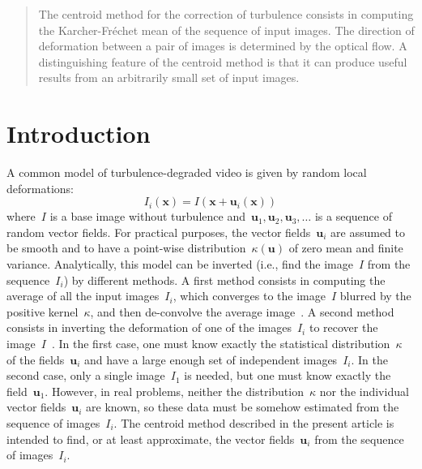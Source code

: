 \documentclass{ipol}
\def\x{\mathbf{x}}
\def\u{\mathbf{u}}
\begin{document}
\begin{abstract}
	The centroid method for the correction of turbulence consists in computing
	the Karcher-Fréchet mean of the sequence of input images.  The direction of
	deformation between a pair of images is determined by the optical flow.
	A distinguishing feature of the centroid method is that it can produce
	useful results from an arbitrarily small set of input images.
\end{abstract}

%
%
%
%

\section{Introduction}

A common model of turbulence-degraded video is given by random local
deformations:
\begin{equation}
	I_i(\x)=I(\x+\u_i(\x)) %
\end{equation}
where~$I$ is a base image without turbulence and~$\u_1, \u_2, \u_3,\ldots$ is a sequence of
random vector fields.  For practical purposes, the vector fields~$\u_i$ are
assumed to be smooth and to have a point-wise distribution~$\kappa(\u)$ of
zero mean and finite variance.  Analytically, this model can be inverted
(i.e., find the image~$I$ from the sequence~$I_i$) by different methods.
A first 
method consists in %
computing the average of all the
input images~$I_i$, which converges to the image~$I$ blurred by the positive
kernel~$\kappa$, and then de-convolve the average
image~\cite{Fried1978,getreuer2012,Gilles2012,micheli2012linear}.
A second method consists in inverting the deformation of one of the
images~$I_i$ to recover the
image~$I$~\cite{frakes2001suppression,efros2005,tian2009seeing,ipol.2013.46,micheli2013}.
In the first case, one must know
exactly the statistical distribution~$\kappa$ of the fields~$\u_i$ and have a
large enough set of independent images~$I_i$.  In the second case, only a
single image~$I_1$ is needed, but one must know exactly the field~$\u_1$.  
However, in real
problems, neither the distribution~$\kappa$ nor the individual
vector fields~$\u_i$ %
are known, so these data must be somehow estimated from the sequence of images~$I_i$.  The
centroid method described in the present article is intended to find, or at
least approximate, the vector fields~$\u_i$ from the sequence of images~$I_i$.
\end{document}
